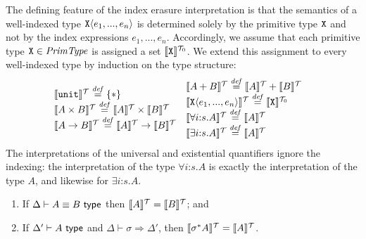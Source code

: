 The defining feature of the index erasure interpretation is that the
semantics of a well-indexed type $\textup{\texttt{X}}\langle e_1,...,e_n \rangle$ is
determined solely by the primitive type $\textup{\texttt{X}}$ and not by the
index expressions $e_1,...,e_n$. Accordingly, we assume that each
primitive type $\textup{\texttt{X}} \in \mathit{PrimType}$ is assigned a set
$\llbracket \textup{\texttt{X}} \rrbracket^{\mathcal{T}_0}$. We extend this assignment to every
well-indexed type by induction on the type structure:
\begin{displaymath}
  \begin{array}{@{\hspace{0em}}c@{\hspace{0em}}c}
    \begin{array}{@{}l}
      \tySem{\tyUnit} \isDefinedAs \{*\} \\
      \tySem{A \tyProduct B} \isDefinedAs \tySem{A} \times \tySem{B} \\
      \tySem{A \tyArr B} \isDefinedAs \tySem{A} \to \tySem{B} \\
    \end{array}
    &
    \begin{array}{l}
      \tySem{A + B} \isDefinedAs \tySem{A} + \tySem{B} \\
      \tySem{\tyPrim{X}{e_1,...,e_n}} \isDefinedAs \tyPrimSem{\tyPrimNm{X}} \\
      \tySem{\forall i\mathord:s. A} \isDefinedAs \tySem{A} \\
      \tySem{\exists i\mathord:s. A} \isDefinedAs \tySem{A}
    \end{array}
  \end{array}
\end{displaymath}
The interpretations of the
universal and existential quantifiers ignore the indexing: the
interpretation of the type $\forall i\mathord:s.A$ is exactly the
interpretation of the type $A$, and likewise for $\exists
i\mathord:s.A$.

\begin{lemma}\label{lem:tyeqsubst-erasure}
  \begin{enumerate}
  \item If $\Delta \vdash A \equiv B \textsf{ type}$ then $\llbracket A \rrbracket^{\mathcal{T}} =
    \llbracket B \rrbracket^{\mathcal{T}}$; and
  \item If $\Delta' \vdash A \textsf{ type}$ and $\Delta \vdash \sigma
    \Rightarrow \Delta'$, then $\llbracket \sigma^*A \rrbracket^{\mathcal{T}} = \llbracket A \rrbracket^{\mathcal{T}}$.
  \end{enumerate}
\end{lemma}

